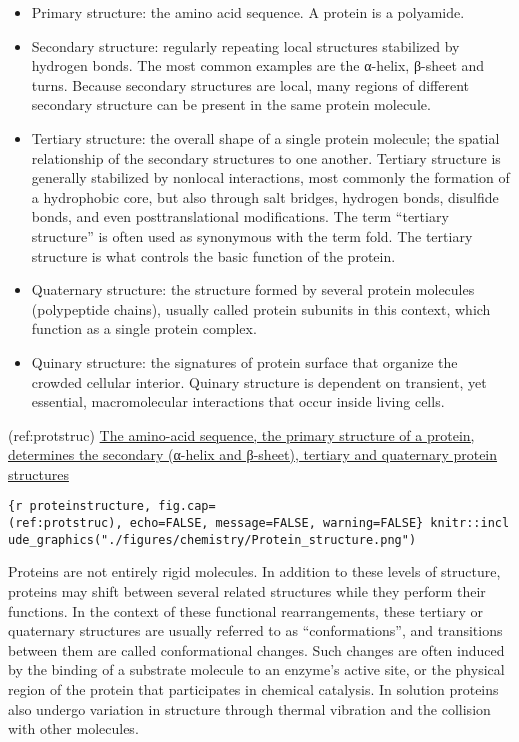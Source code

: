 \begin{itemize}
\tightlist
\item
  Primary structure: the amino acid sequence. A protein is a polyamide.
\item
  Secondary structure: regularly repeating local structures stabilized
  by hydrogen bonds. The most common examples are the α-helix, β-sheet
  and turns. Because secondary structures are local, many regions of
  different secondary structure can be present in the same protein
  molecule.
\item
  Tertiary structure: the overall shape of a single protein molecule;
  the spatial relationship of the secondary structures to one another.
  Tertiary structure is generally stabilized by nonlocal interactions,
  most commonly the formation of a hydrophobic core, but also through
  salt bridges, hydrogen bonds, disulfide bonds, and even
  posttranslational modifications. The term ``tertiary structure'' is
  often used as synonymous with the term fold. The tertiary structure is
  what controls the basic function of the protein.
\item
  Quaternary structure: the structure formed by several protein
  molecules (polypeptide chains), usually called protein subunits in
  this context, which function as a single protein complex.
\item
  Quinary structure: the signatures of protein surface that organize the
  crowded cellular interior. Quinary structure is dependent on
  transient, yet essential, macromolecular interactions that occur
  inside living cells.
\end{itemize}

(ref:protstruc)
\href{https://commons.wikimedia.org/wiki/File:Protein_structure.png}{The
amino-acid sequence, the primary structure of a protein, determines the
secondary (α-helix and β-sheet), tertiary and quaternary protein
structures}

\texttt{\{r\ proteinstructure,\ fig.cap=\textquotesingle{}(ref:protstruc)\textquotesingle{},\ echo=FALSE,\ message=FALSE,\ warning=FALSE\}\ knitr::include\_graphics("./figures/chemistry/Protein\_structure.png")}

Proteins are not entirely rigid molecules. In addition to these levels
of structure, proteins may shift between several related structures
while they perform their functions. In the context of these functional
rearrangements, these tertiary or quaternary structures are usually
referred to as ``conformations'', and transitions between them are
called conformational changes. Such changes are often induced by the
binding of a substrate molecule to an enzyme's active site, or the
physical region of the protein that participates in chemical catalysis.
In solution proteins also undergo variation in structure through thermal
vibration and the collision with other molecules.

